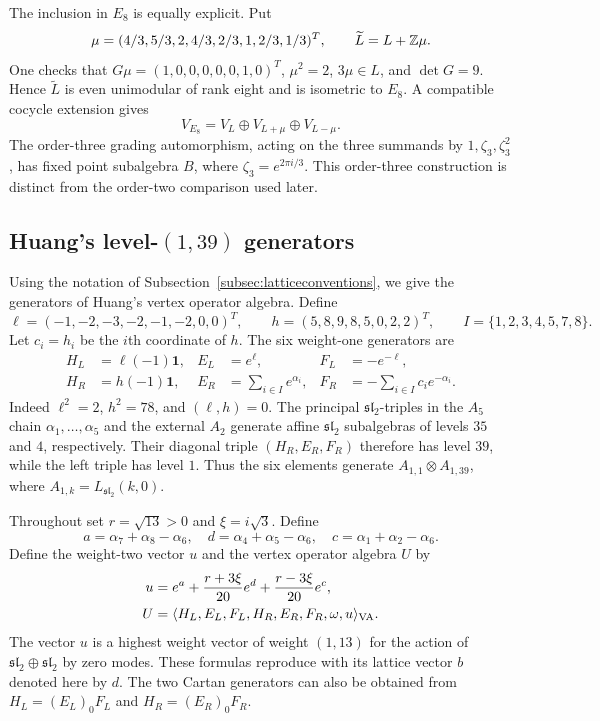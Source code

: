 \documentclass[11pt,reqno]{amsart}
\theoremstyle{definition}\newtheorem{definition}[theorem]{Definition}
\theoremstyle{remark}\newtheorem{remark}[theorem]{Remark}
\newcommand{\one}{\mathbf1}\newcommand{\slc}{\mathfrak{sl}_2}
\numberwithin{equation}{section}
\begin{document}
The inclusion in $E_8$ is equally explicit. Put
\begin{equation}\label{eq:glue}
 \mu=(4/3,5/3,2,4/3,2/3,1,2/3,1/3)^T,\qquad \widetilde L=L+\mathbb Z\mu.
\end{equation}
One checks that $G\mu=(1,0,0,0,0,0,1,0)^T$, $\mu^2=2$, $3\mu\in L$, and $\det G=9$. Hence $\widetilde L$ is even unimodular of rank eight and is isometric to $E_8$. A compatible cocycle extension gives
\begin{equation}
 V_{E_8}=V_L\oplus V_{L+\mu}\oplus V_{L-\mu}.
\end{equation}
The order-three grading automorphism, acting on the three summands by $1,\zeta_3,\zeta_3^2$, has fixed point subalgebra $B$, where $\zeta_3=e^{2\pi i/3}$. This order-three construction is distinct from the order-two comparison used later.

\subsection{Huang's level-\texorpdfstring{$(1,39)$}{(1,39)} generators}
Using the notation of Subsection~\ref{subsec:latticeconventions}, we give the generators of Huang's vertex operator algebra. Define
\[
 \ell=(-1,-2,-3,-2,-1,-2,0,0)^T,\qquad
 h=(5,8,9,8,5,0,2,2)^T,\qquad I=\{1,2,3,4,5,7,8\}.
\]
Let $c_i=h_i$ be the $i$th coordinate of $h$. The six weight-one generators are
\begin{align}
 H_L&=\ell(-1)\one,& E_L&=e^\ell,& F_L&=-e^{-\ell},\label{eq:Hleft}\\
 H_R&=h(-1)\one,& E_R&=\sum_{i\in I}e^{\alpha_i},&
 F_R&=-\sum_{i\in I}c_i e^{-\alpha_i}.\label{eq:Hright}
\end{align}
Indeed $\ell^2=2$, $h^2=78$, and $(\ell,h)=0$. The principal $\slc$-triples in the $A_5$ chain $\alpha_1,\ldots,\alpha_5$ and the external $A_2$ generate affine $\slc$ subalgebras of levels $35$ and $4$, respectively. Their diagonal triple $(H_R,E_R,F_R)$ therefore has level $39$, while the left triple has level $1$. Thus the six elements generate $A_{1,1}\otimes A_{1,39}$, where $A_{1,k}=L_{\slc}(k,0)$.

Throughout set $r=\sqrt{13}>0$ and $\xi =i\sqrt3$. Define
\[
 a=\alpha_7+\alpha_8-\alpha_6,\quad
 d=\alpha_4+\alpha_5-\alpha_6,\quad
 c=\alpha_1+\alpha_2-\alpha_6.
\]
Define the weight-two vector $u$ and the vertex operator algebra $U$ by
\begin{align}
 u&=e^a+\frac{r+3\xi }{20}e^d+\frac{r-3\xi }{20}e^c,\label{eq:Hgenerator}\\
 U&=\langle H_L,E_L,F_L,H_R,E_R,F_R,\omega,u\rangle_{\rm VA}.
 \label{eq:Hdef}
\end{align}
The vector $u$ is a highest weight vector of weight $(1,13)$ for the action of $\slc\oplus\slc$ by zero modes. These formulas reproduce \cite[Section 2, (3)--(8)]{Huang} with its lattice vector $b$ denoted here by $d$. The two Cartan generators can also be obtained from $H_L=(E_L)_{0}F_L$ and $H_R=(E_R)_{0}F_R$.
\end{document}
